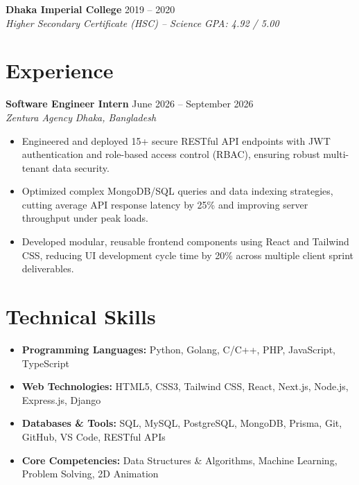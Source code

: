 \documentclass[11pt,letterpaper]{article}
\begin{document}
\vspace{6pt}
\noindent
\textbf{Dhaka Imperial College} \hfill 2019 -- 2020 \\
\textit{Higher Secondary Certificate (HSC) -- Science} \hfill \textit{GPA: 4.92 / 5.00}

\section*{Experience}
\noindent
\textbf{Software Engineer Intern} \hfill June 2026 -- September 2026 \\
\textit{Zentura Agency} \hfill \textit{Dhaka, Bangladesh}
\begin{itemize}
    \item Engineered and deployed 15+ secure RESTful API endpoints with JWT authentication and role-based access control (RBAC), ensuring robust multi-tenant data security.
    \item Optimized complex MongoDB/SQL queries and data indexing strategies, cutting average API response latency by 25\% and improving server throughput under peak loads.
    \item Developed modular, reusable frontend components using React and Tailwind CSS, reducing UI development cycle time by 20\% across multiple client sprint deliverables.
\end{itemize}

\section*{Technical Skills}
\begin{itemize}[leftmargin=0pt, label={}]
    \item \textbf{Programming Languages:} Python, Golang, C/C++, PHP, JavaScript, TypeScript
    \item \textbf{Web Technologies:} HTML5, CSS3, Tailwind CSS, React, Next.js, Node.js, Express.js, Django
    \item \textbf{Databases \& Tools:} SQL, MySQL, PostgreSQL, MongoDB, Prisma, Git, GitHub, VS Code, RESTful APIs
    \item \textbf{Core Competencies:} Data Structures \& Algorithms, Machine Learning, Problem Solving, 2D Animation
\end{itemize}

\end{document}
